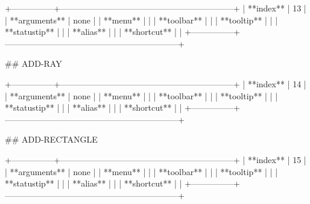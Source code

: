 +---------------+--------------------------------------------------------------+
| **index**     | 13                                                           |
| **arguments** | none                                                         |
| **menu**      |                                                              |
| **toolbar**   |                                                              |
| **tooltip**   |                                                              |
| **statustip** |                                                              |
| **alias**     |                                                              |
| **shortcut**  |                                                              |
+---------------+--------------------------------------------------------------+


## ADD-RAY

+---------------+--------------------------------------------------------------+
| **index**     | 14                                                           |
| **arguments** | none                                                         |
| **menu**      |                                                              |
| **toolbar**   |                                                              |
| **tooltip**   |                                                              |
| **statustip** |                                                              |
| **alias**     |                                                              |
| **shortcut**  |                                                              |
+---------------+--------------------------------------------------------------+


## ADD-RECTANGLE

+---------------+--------------------------------------------------------------+
| **index**     | 15                                                           |
| **arguments** | none                                                         |
| **menu**      |                                                              |
| **toolbar**   |                                                              |
| **tooltip**   |                                                              |
| **statustip** |                                                              |
| **alias**     |                                                              |
| **shortcut**  |                                                              |
+---------------+--------------------------------------------------------------+



